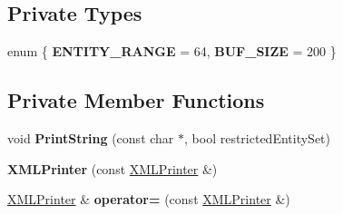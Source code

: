 \subsection*{Private Types}
\begin{DoxyCompactItemize}
\item 
\mbox{\label{classtinyxml2_1_1XMLPrinter_ac9049bee10d230eb31ff7d146d538f7a}} 
enum \{ {\bfseries E\+N\+T\+I\+T\+Y\+\_\+\+R\+A\+N\+GE} = 64, 
{\bfseries B\+U\+F\+\_\+\+S\+I\+ZE} = 200
 \}
\end{DoxyCompactItemize}
\subsection*{Private Member Functions}
\begin{DoxyCompactItemize}
\item 
\mbox{\label{classtinyxml2_1_1XMLPrinter_a5495e504053f63f2c4d603327314fa91}} 
void {\bfseries Print\+String} (const char $\ast$, bool restricted\+Entity\+Set)
\item 
\mbox{\label{classtinyxml2_1_1XMLPrinter_a157706836c056febc4022dc540a47982}} 
{\bfseries X\+M\+L\+Printer} (const \mbox{\hyperlink{classtinyxml2_1_1XMLPrinter}{X\+M\+L\+Printer}} \&)
\item 
\mbox{\label{classtinyxml2_1_1XMLPrinter_a7706d90e6cd31ef081742e8344b3f9bc}} 
\mbox{\hyperlink{classtinyxml2_1_1XMLPrinter}{X\+M\+L\+Printer}} \& {\bfseries operator=} (const \mbox{\hyperlink{classtinyxml2_1_1XMLPrinter}{X\+M\+L\+Printer}} \&)
\end{DoxyCompactItemize}
